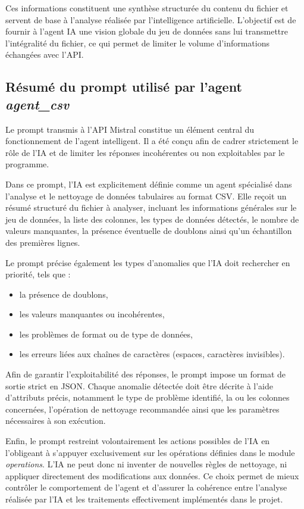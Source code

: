 \documentclass[a4paper, 12pt, twoside]{article}
\begin{document}
Ces informations constituent une synthèse structurée du contenu du fichier et servent de base à l’analyse réalisée par l’intelligence artificielle. L’objectif est de fournir à l’agent IA une vision globale du jeu de données sans lui transmettre l’intégralité du fichier, ce qui permet de limiter le volume d’informations échangées avec l’API.

\newpage
\subsection{Résumé du prompt utilisé par l’agent \textit{agent\_csv}}

Le prompt transmis à l’API Mistral constitue un élément central du fonctionnement de l’agent intelligent. Il a été conçu afin de cadrer strictement le rôle de l’IA et de limiter les réponses incohérentes ou non exploitables par le programme.

Dans ce prompt, l’IA est explicitement définie comme un agent spécialisé dans l’analyse et le nettoyage de données tabulaires au format CSV. Elle reçoit un résumé structuré du fichier à analyser, incluant les informations générales sur le jeu de données, la liste des colonnes, les types de données détectés, le nombre de valeurs manquantes, la présence éventuelle de doublons ainsi qu’un échantillon des premières lignes.

Le prompt précise également les types d’anomalies que l’IA doit rechercher en priorité, tels que :
\begin{itemize}
    \item la présence de doublons,
    \item les valeurs manquantes ou incohérentes,
    \item les problèmes de format ou de type de données,
    \item les erreurs liées aux chaînes de caractères (espaces, caractères invisibles).
\end{itemize}

Afin de garantir l’exploitabilité des réponses, le prompt impose un format de sortie strict en JSON. Chaque anomalie détectée doit être décrite à l’aide d’attributs précis, notamment le type de problème identifié, la ou les colonnes concernées, l’opération de nettoyage recommandée ainsi que les paramètres nécessaires à son exécution.

Enfin, le prompt restreint volontairement les actions possibles de l’IA en l’obligeant à s’appuyer exclusivement sur les opérations définies dans le module \textit{operations}. L’IA ne peut donc ni inventer de nouvelles règles de nettoyage, ni appliquer directement des modifications aux données. Ce choix permet de mieux contrôler le comportement de l’agent et d’assurer la cohérence entre l’analyse réalisée par l’IA et les traitements effectivement implémentés dans le projet.
\end{document}
